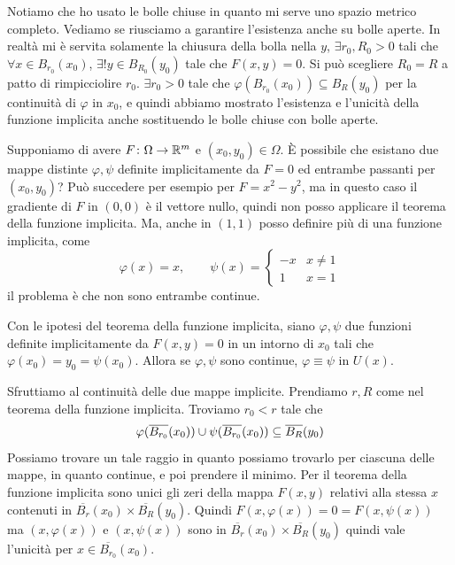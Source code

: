 \documentclass[a4paper]{article}
\begin{document}
\begin{radioactive}
Notiamo che ho usato le bolle chiuse in quanto mi serve uno spazio metrico completo.
Vediamo se riusciamo a garantire l'esistenza anche su bolle aperte.
In realtà mi è servita solamente la chiusura della bolla nella \(y\),
\(\exists r_0, R_0>0\) tali che \(\forall x \in B_{r_0}(x_0)\),
\(\exists! y \in B_{R_0}(y_0)\) tale che \(F(x,y) =0\).
Si può scegliere \(R_0=R\) a patto di rimpicciolire \(r_0\).
\(\exists r_0 > 0\) tale che \(\varphi(B_{r_0}(x_0)) \subseteq B_R(y_0)\)
per la continuità di \(\varphi\) in \(x_0\), e quindi
abbiamo mostrato l'esistenza e l'unicità della funzione implicita
anche sostituendo le bolle chiuse con bolle aperte.

Supponiamo di avere \(F \colon \Omega \to \mathbb{R}^m\) e \((x_0, y_0) \in \Omega\).
È possibile che esistano due mappe distinte \(\varphi, \psi\) definite implicitamente
da \(F=0\) ed entrambe passanti per \((x_0, y_0)\)?
Può succedere per esempio per \(F=x^2 - y^2\), ma in questo caso
il gradiente di \(F\) in \((0,0)\) è il vettore nullo, quindi non posso applicare
il teorema della funzione implicita.
Ma, anche in \((1,1)\) posso definire più di una funzione implicita, come
\[
    \varphi(x)= x, \qquad \psi(x) = \begin{cases}
        -x & x \neq 1 \\
        1 & x=1
    \end{cases}
\]
il problema è che non sono entrambe continue.
\end{radioactive}

\begin{radioactive}
\begin{snippetcorollary}{}
    Con le ipotesi del teorema della funzione implicita, siano
    \(\varphi, \psi\) due funzioni definite implicitamente da \(F(x,y)=0\)
    in un intorno di \(x_0\) tali che \(\varphi(x_0) = y_0 = \psi(x_0)\).
    Allora se \(\varphi, \psi\) sono continue, \(\varphi \equiv \psi\) in \(U(x)\).
\end{snippetcorollary}
\end{radioactive}

\begin{radioactive}
\begin{snippetproof}{}
    Sfruttiamo al continuità delle due mappe implicite.
    Prendiamo \(r, R\) come nel teorema della funzione implicita.
    Troviamo \(r_0 < r\) tale che
    \[
        \varphi(\overline{B_{r_0}}(x_0))
        \cup \psi(\overline{B_{r_0}}(x_0))
        \subseteq \overline{B_R}(y_0)
    \]
    Possiamo trovare un tale raggio in quanto possiamo trovarlo per ciascuna delle mappe,
    in quanto continue, e poi prendere il minimo.
    Per il teorema della funzione implicita sono unici
    gli zeri della mappa \(F(x,y)\) relativi alla stessa \(x\)
    contenuti in \(\overline{B_r}(x_0) \times \overline{B_R}(y_0)\).
    Quindi \(F(x, \varphi(x)) = 0 = F(x, \psi(x))\) ma \((x, \varphi(x))\)
    e \((x, \psi(x))\) sono in \(\overline{B_r}(x_0) \times \overline{B_R}(y_0)\)
    quindi vale l'unicità per \(x \in \overline{B_{r_0}}(x_0)\).
\end{snippetproof}
\end{radioactive}
\end{document}
